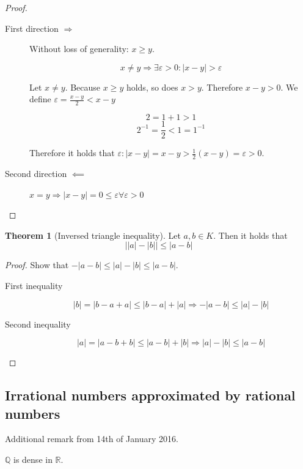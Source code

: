\documentclass[a4paper,landscape,twocolumn]{article}
\theoremstyle{definition}
\newtheorem{theorem}{Theorem}
\newcommand\abs[1]{\left|#1\right|}
\begin{document}
\begin{proof}
  \begin{description}
    \item[First direction $\Rightarrow$]
      Without loss of generality: $x \geq y$.

      \[ x \neq y \Rightarrow \exists \varepsilon > 0: \abs{x - y} > \varepsilon \]

      Let $x \neq y$. Because $x \geq y$ holds, so does $x > y$. Therefore $x - y > 0$.
      We define $\varepsilon = \frac{x-y}{2} < x - y$

      \[ 2 = 1 + 1 > 1 \]
      \[ 2^{-1} = \frac12 < 1 = 1^{-1} \]

      Therefore it holds that $\varepsilon: \abs{x-y} = x - y > \frac12(x - y) = \varepsilon > 0$.

    \item[Second direction $\impliedby$]
      $x = y \Rightarrow \abs{x-y} = 0 \leq \varepsilon \forall \varepsilon > 0$
  \end{description}
\end{proof}

\begin{theorem}[Inversed triangle inequality]
  Let $a, b \in K$. Then it holds that
  \[ \abs{\abs{a} - \abs{b}} \leq \abs{a - b} \]
\end{theorem}

\begin{proof}
  Show that $-\abs{a - b} \leq \abs{a} - \abs{b} \leq \abs{a - b}$.
  \begin{description}
    \item[First inequality]
      \[ \abs{b} = \abs{b - a + a} \leq \abs{b - a} + \abs{a} \Rightarrow -\abs{a - b} \leq \abs{a} - \abs{b} \]
    \item[Second inequality]
      \[ \abs{a} = \abs{a - b + b} \leq \abs{a - b} + \abs{b} \Rightarrow \abs{a} - \abs{b} \leq \abs{a - b} \]
  \end{description}
\end{proof}

\subsection{Irrational numbers approximated by rational numbers}
%
Additional remark from 14th of January 2016.

$\mathbb Q$ is dense in $\mathbb R$.
\end{document}
